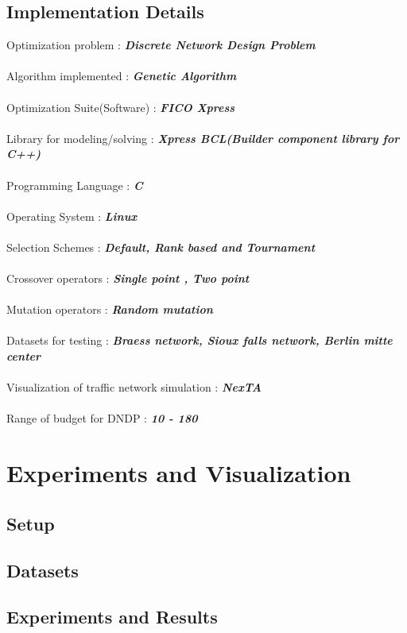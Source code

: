 \documentclass[a4paper, 12pt]{article}
\begin{document}
\subsection{Implementation Details}
\vspace{15mm}
Optimization problem :     \textbf{\textit{Discrete Network Design Problem}}\\~\\
Algorithm implemented :    \textbf{\textit{Genetic Algorithm}}\\~\\
Optimization Suite(Software) : \textbf{\textit{FICO Xpress}}\\~\\
Library for modeling/solving : \textbf{\textit{Xpress BCL(Builder component library for C++)}}\\~\\
Programming Language : \textbf{\textit{C}}\\~\\
Operating System : \textbf{\textit{Linux}}\\~\\
Selection Schemes : \textbf{\textit{Default, Rank based and Tournament}}\\~\\
Crossover operators : \textbf{\textit{Single point , Two point}}\\~\\
Mutation operators : \textbf{\textit{Random mutation}}\\~\\
Datasets for testing : \textbf{\textit{Braess network, Sioux falls network, Berlin mitte center}}\\~\\
Visualization of traffic network simulation : \textbf{\textit{NexTA}}\\~\\
Range of budget for DNDP : \textbf{\textit{10 - 180}}\\
\newpage
\section{Experiments and Visualization}
\subsection{Setup}
\subsection{Datasets}
\subsection{Experiments and Results}
\end{document}
